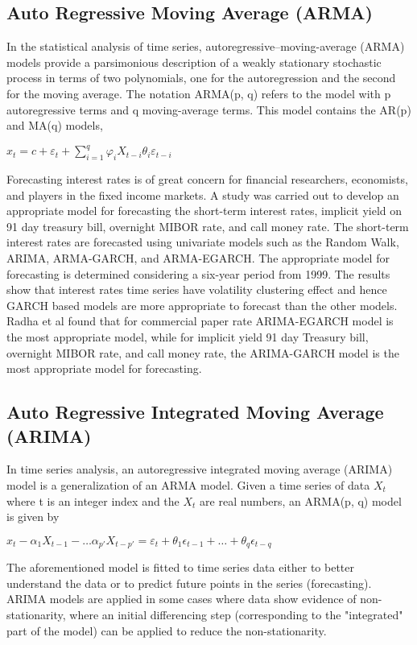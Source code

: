 \subsection{Auto Regressive Moving Average (ARMA)}

In the statistical analysis of time series, autoregressive–moving-average (ARMA) models provide a parsimonious description of a weakly stationary stochastic process in terms of two polynomials, one for the autoregression and the second for the moving average. The notation ARMA(p, q) refers to the model with p autoregressive terms and q moving-average terms. This model contains the AR(p) and MA(q) models,

\(x_t = c+\varepsilon_t+\sum^{q}_{i=1} \varphi_iX_{t-i}\theta_i\varepsilon_{t-i}\)

Forecasting interest rates is of great concern for financial researchers, economists, and players in the fixed income markets. A study was carried out to develop an appropriate model for forecasting the short-term interest rates, implicit yield on 91 day treasury bill, overnight MIBOR rate, and call money rate.\cite{Radha:2015aa} The short-term interest rates are forecasted using univariate models such as the Random Walk, ARIMA, ARMA-GARCH, and ARMA-EGARCH. The appropriate model for forecasting is determined considering a six-year period from 1999. The results show that interest rates time series have volatility clustering effect and hence GARCH based models are more appropriate to forecast than the other models. Radha et al found that for commercial paper rate ARIMA-EGARCH model is the most appropriate model, while for implicit yield 91 day Treasury bill, overnight MIBOR rate, and call money rate, the ARIMA-GARCH model is the most appropriate model for forecasting.

\subsection{Auto Regressive Integrated Moving Average (ARIMA)}

In time series analysis, an autoregressive integrated moving average (ARIMA) model is a generalization of an ARMA model. Given a time series of data $X_t$ where t is an integer index and the $X_t$ are real numbers, an ARMA(p, q) model is given by

\(x_t - \alpha_1 X_{t-1} - \dots \alpha_{p'} X_{t-p'} = \varepsilon_t + \theta_1 \epsilon_{t-1} + \dots + \theta_q \epsilon_{t-q}\)

The aforementioned model is fitted to time series data either to better understand the data or to predict future points in the series (forecasting). ARIMA models are applied in some cases where data show evidence of non-stationarity, where an initial differencing step (corresponding to the "integrated" part of the model) can be applied to reduce the non-stationarity. 

